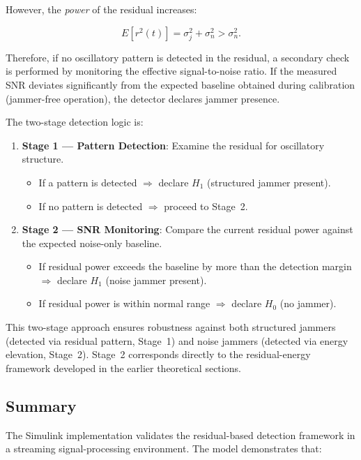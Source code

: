 \documentclass{article}
\begin{document}
However, the \emph{power} of the residual increases:

\begin{equation}
E[r^2(t)] = \sigma_j^2 + \sigma_n^2 > \sigma_n^2.
\end{equation}

Therefore, if no oscillatory pattern is detected in the residual, a secondary check is performed by monitoring the effective signal-to-noise ratio. If the measured SNR deviates significantly from the expected baseline obtained during calibration (jammer-free operation), the detector declares jammer presence.

The two-stage detection logic is:

\begin{enumerate}
\item \textbf{Stage 1 — Pattern Detection}: Examine the residual for oscillatory structure.
\begin{itemize}
\item If a pattern is detected $\Rightarrow$ declare $H_1$ (structured jammer present).
\item If no pattern is detected $\Rightarrow$ proceed to Stage~2.
\end{itemize}
\item \textbf{Stage 2 — SNR Monitoring}: Compare the current residual power against the expected noise-only baseline.
\begin{itemize}
\item If residual power exceeds the baseline by more than the detection margin $\Rightarrow$ declare $H_1$ (noise jammer present).
\item If residual power is within normal range $\Rightarrow$ declare $H_0$ (no jammer).
\end{itemize}
\end{enumerate}

This two-stage approach ensures robustness against both structured jammers (detected via residual pattern, Stage~1) and noise jammers (detected via energy elevation, Stage~2). Stage~2 corresponds directly to the residual-energy framework developed in the earlier theoretical sections.

\subsection{Summary}

The Simulink implementation validates the residual-based detection framework in a streaming signal-processing environment. The model demonstrates that:
\end{document}

